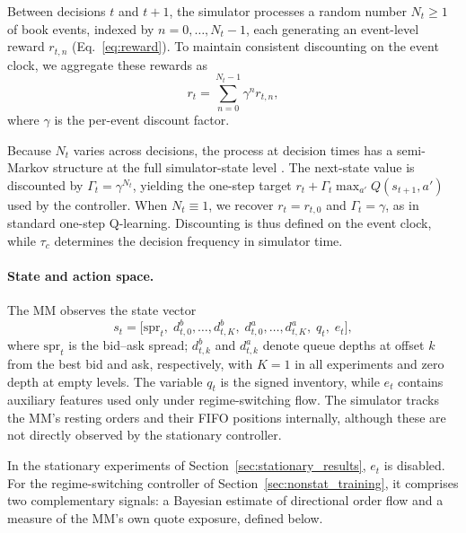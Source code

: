\documentclass[11pt,a4paper]{article}
\begin{document}
Between decisions $t$ and $t+1$, the simulator processes
a random number $N_t\geq1$ of book events, indexed by
$n=0,\ldots,N_t-1$, each generating an event-level reward
$r_{t,n}$ (Eq.~\eqref{eq:reward}).
To maintain consistent discounting on the event clock,
we aggregate these rewards as
\begin{equation}
    r_t=\sum_{n=0}^{N_t-1}\gamma^n r_{t,n},
    \label{eq:smdp_reward}
\end{equation}
where $\gamma$ is the per-event discount factor.

Because $N_t$ varies across decisions, the process at
decision times has a semi-Markov structure at the full
simulator-state level
\citep{puterman1994,sutton1999options}.
The next-state value is discounted by
$\Gamma_t=\gamma^{N_t}$, yielding the one-step target
$r_t+\Gamma_t\max_{a'}Q(s_{t+1},a')$ used by the controller.
When $N_t\equiv1$, we recover $r_t=r_{t,0}$ and
$\Gamma_t=\gamma$, as in standard one-step Q-learning.
Discounting is thus defined on the event clock, while
$\tau_c$ determines the decision frequency in simulator
time.

\paragraph{State and action space.}
The MM observes the state vector
\begin{equation}
  s_t=
  \bigl[\mathrm{spr}_t,\;
  d_{t,0}^{b},\ldots,d_{t,K}^{b},\;
  d_{t,0}^{a},\ldots,d_{t,K}^{a},\;
  q_t,\;e_t\bigr],
  \label{eq:state_vector}
\end{equation}
where $\mathrm{spr}_t$ is the bid--ask spread;
$d_{t,k}^{b}$ and $d_{t,k}^{a}$ denote queue depths
at offset $k$ from the best bid and ask, respectively,
with $K=1$ in all experiments and zero depth at empty levels.
The variable $q_t$ is the signed inventory, while $e_t$
contains auxiliary features used only under regime-switching
flow. The simulator tracks the MM's resting orders and
their FIFO positions internally, although these are not
directly observed by the stationary controller.

In the stationary experiments of
Section~\ref{sec:stationary_results}, $e_t$ is disabled.
For the regime-switching controller of
Section~\ref{sec:nonstat_training}, it comprises two
complementary signals: a Bayesian estimate of directional
order flow and a measure of the MM's own quote exposure,
defined below.
\end{document}
